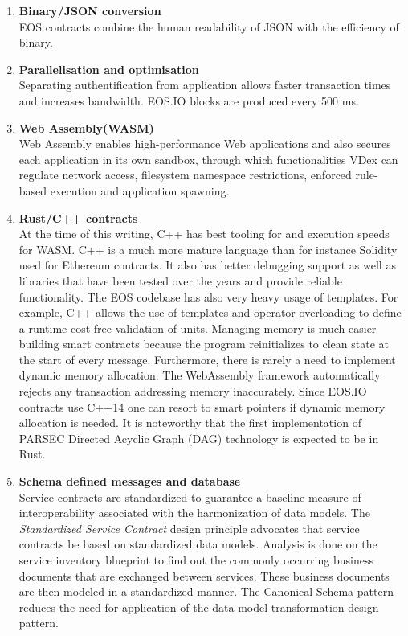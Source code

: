 \documentclass[]{article}
\begin{document}
{\begin{enumerate}
		\item\textbf{ Binary/JSON conversion} \\
		 EOS contracts combine the human readability of JSON with the efficiency of binary. \\
	
		\item \textbf{Parallelisation and optimisation\\ } 
		Separating authentification from application allows faster transaction times and increases bandwidth.
		EOS.IO blocks are produced every 500 ms.
		
	\item \textbf{Web Assembly(WASM)}   \\
  Web Assembly enables high-performance Web applications and also secures each application in its own sandbox, through which functionalities VDex can regulate network access, filesystem namespace restrictions, enforced rule-based execution and application spawning. 

	\item \textbf{Rust/C++ contracts\\}
	At the time of this writing,
	C++ has best tooling for and execution speeds for WASM.
	C++ is a much more mature language than for instance Solidity used for Ethereum contracts.
	It also has better debugging support as well as libraries that have been tested over the years and provide reliable functionality. 
	The EOS codebase has also very heavy usage of templates.
	For example, C++ allows the use of templates and operator overloading to define a runtime cost-free validation of units.
	Managing memory is much easier building smart contracts because the
	program reinitializes to clean state at the start of every message. 
	Furthermore, there is rarely a need to implement dynamic memory allocation. 
	The WebAssembly framework automatically rejects any transaction addressing memory inaccurately.
	Since EOS.IO contracts use C++14 one can resort to smart pointers if dynamic memory allocation is needed.
	It is noteworthy that the first implementation of PARSEC Directed Acyclic Graph (DAG) technology is expected to be in Rust.\cite{23}
	 	
	\item \textbf{Schema defined messages and database} \\
	Service contracts are standardized to guarantee a baseline measure of interoperability associated with the harmonization of data models.
	The \textit{Standardized Service Contract} design principle advocates that service contracts be based on standardized data models. 
	Analysis is done on the service inventory blueprint to find out the commonly occurring business documents that are exchanged between services. 
	These business documents are then modeled in a standardized manner. 
	The Canonical Schema pattern reduces the need for application of the data model transformation design pattern.
	\cite{1}
	

\end{enumerate}}
\end{document}
